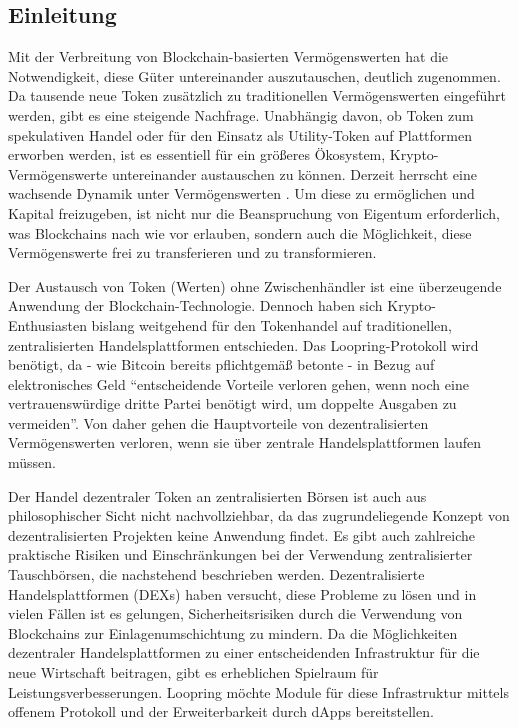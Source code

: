 \documentclass[UTF8,nofonts]{article}
\begin{document}
\begin{multicols}{2}
\section{Einleitung\label{sec:introduction}}
Mit der Verbreitung von Blockchain-basierten Vermögenswerten hat die Notwendigkeit, diese Güter untereinander auszutauschen, deutlich zugenommen. Da tausende neue Token zusätzlich zu traditionellen Vermögenswerten eingeführt werden, gibt es eine steigende Nachfrage. Unabhängig davon, ob Token zum spekulativen Handel oder für den Einsatz als Utility-Token auf Plattformen erworben werden, ist es essentiell für ein größeres Ökosystem, Krypto-Vermögenswerte untereinander austauschen zu können. Derzeit herrscht eine wachsende Dynamik unter Vermögenswerten \cite{desotocapital}. Um diese zu ermöglichen und Kapital freizugeben, ist nicht nur die Beanspruchung von Eigentum erforderlich, was Blockchains nach wie vor erlauben, sondern auch die Möglichkeit, diese Vermögenswerte frei zu transferieren und zu transformieren.

Der Austausch von Token (Werten) ohne Zwischenhändler ist eine überzeugende Anwendung der Blockchain-Technologie. Dennoch haben sich Krypto-Enthusiasten bislang weitgehend für den Tokenhandel auf traditionellen, zentralisierten Handelsplattformen entschieden. Das Loopring-Protokoll wird benötigt, da - wie Bitcoin \cite{nakamoto2008bitcoin} bereits pflichtgemäß betonte - in Bezug auf elektronisches Geld \enquote{entscheidende Vorteile verloren gehen, wenn noch eine vertrauenswürdige dritte Partei benötigt wird, um doppelte Ausgaben zu vermeiden}. Von daher gehen die Hauptvorteile von dezentralisierten Vermögenswerten verloren, wenn sie über zentrale Handelsplattformen laufen müssen.

Der Handel dezentraler Token an zentralisierten Börsen ist auch aus philosophischer Sicht nicht nachvollziehbar, da das zugrundeliegende Konzept von dezentralisierten Projekten keine Anwendung findet. Es gibt auch zahlreiche praktische Risiken und Einschränkungen bei der Verwendung zentralisierter Tauschbörsen, die nachstehend beschrieben werden. Dezentralisierte Handelsplattformen (DEXs) \cite{schuh2015bitshares} \cite{bancor} \cite{kyber} haben versucht, diese Probleme zu lösen und in vielen Fällen ist es gelungen, Sicherheitsrisiken durch die Verwendung von Blockchains zur Einlagenumschichtung zu mindern. Da die Möglichkeiten dezentraler Handelsplattformen zu einer entscheidenden Infrastruktur für die neue Wirtschaft beitragen, gibt es erheblichen Spielraum für Leistungsverbesserungen. Loopring möchte Module für diese Infrastruktur mittels offenem Protokoll und der Erweiterbarkeit durch dApps bereitstellen.


\end{multicols}
\end{document}
